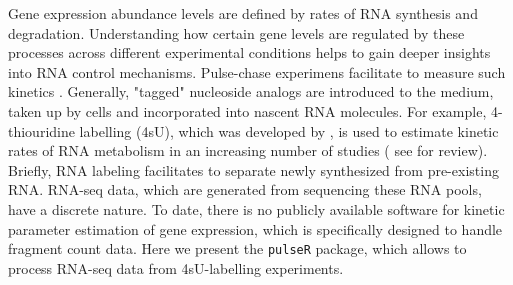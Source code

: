 Gene expression abundance levels are defined by rates of RNA synthesis and degradation.
Understanding how certain gene levels are regulated by these processes across different
experimental conditions helps to gain deeper insights into RNA control mechanisms.
Pulse-chase experimens facilitate to measure such kinetics \citep{wachutka2016measures}. 
Generally, "tagged" nucleoside analogs are introduced to the medium, 
taken up by cells and incorporated into nascent RNA molecules.
For example, 4-thiouridine labelling (4sU), which was developed by \cite{dolken2008high}, is used to estimate 
kinetic rates of RNA metabolism in an increasing number of studies ( 
see \cite{wachutka2016measures} for review). Briefly, RNA labeling facilitates to separate newly synthesized from pre-existing RNA.
RNA-seq data, which are generated from sequencing these RNA pools, have a discrete nature.
To date, there is no publicly available software for kinetic parameter estimation of gene expression, which is specifically designed to handle 
fragment count data. Here we present the \verb|pulseR| package, which allows to 
process RNA-seq data from 4sU-labelling experiments.
